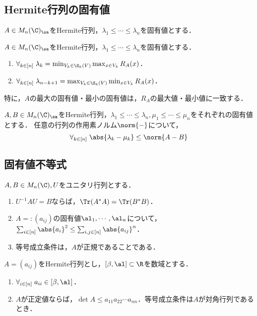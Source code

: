 \documentclass[uplatex, dvipdfmx]{jsreport}
\begin{document}
\subsection{Hermite行列の固有値}

\begin{theorem}
    $A\in M_n(\C)_\sa$をHermite行列，$\lambda_1\le\cdots\le\lambda_n$を固有値とする．
\end{theorem}

\begin{theorem}
    $A\in M_n(\C)_\sa$をHermite行列，$\lambda_1\le\cdots\le\lambda_n$を固有値とする．
    \begin{enumerate}
        \item $\forall_{k\in[n]}\;\lambda_k=\min_{V_k\in\S_k(V)}\max_{x\in V_k}R_A(x)$．
        \item $\forall_{k\in[n]}\;\lambda_{n-k+1}=\max_{V_k\in\S_k(V)}\min_{x\in V_k}R_A(x)$．
    \end{enumerate}
    特に，$A$の最大の固有値・最小の固有値は，$R_A$の最大値・最小値に一致する．
\end{theorem}


\begin{theorem}[摂動定理]
    $A,B\in M_n(\C)_\sa$をHermite行列，$\lambda_1\le\cdots\le\lambda_n,\mu_1\le\cdots\le\mu_n$をそれぞれの固有値とする．
    任意の行列の作用素ノルム$\norm{-}$について，
    \[\forall_{k\in[n]}\;\abs{\lambda_k-\mu_k}\le\norm{A-B}\]
\end{theorem}

\subsection{固有値不等式}

\begin{proposition}
    $A,B\in M_n(\C),U$をユニタリ行列とする．
    \begin{enumerate}
        \item $U^{-1}AU=B$ならば，$\Tr(A^*A)=\Tr(B^*B)$．
        \item $A=:(a_{ij})$の固有値$\al_1,\cdots,\al_n$について，$\sum_{i\in[n]}\abs{a_i}^2\le\sum_{i,j\in[n]}\abs{a_{ij}}^n$．
        \item 等号成立条件は，$A$が正規であることである．
    \end{enumerate}
\end{proposition}

\begin{proposition}
    $A=(a_{ij})$をHermite行列とし，$[\beta,\al]\subset\R$を数域とする．
    \begin{enumerate}
        \item $\forall_{i\in[n]}\;a_{ii}\in[\beta,\al]$．
        \item $A$が正定値ならば，$\det A\le a_{11}a_{22}\cdots a_{nn}$．等号成立条件は$A$が対角行列であるとき．
    \end{enumerate}
\end{proposition}
\end{document}

